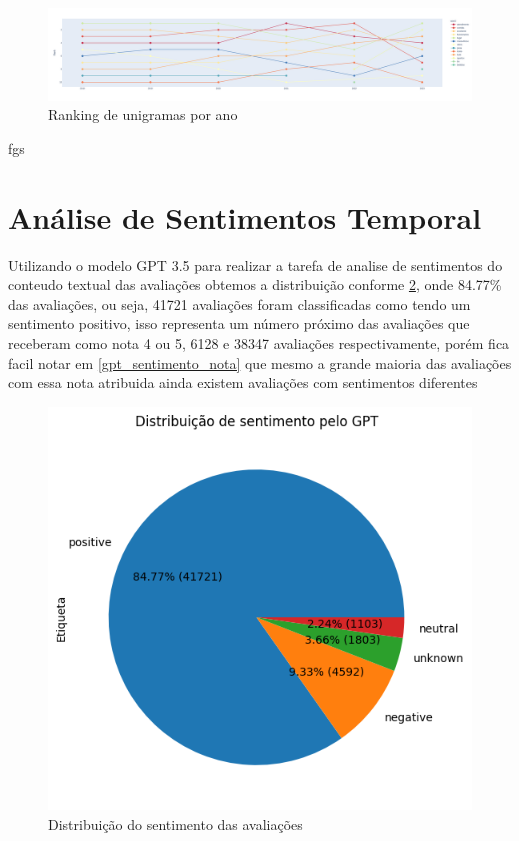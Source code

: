 \begin{figure}
	\centering
	\includegraphics[width=.7\textwidth]{figs/exploratoria/ranking_unigramas_por_ano.png}
	\caption{Ranking de unigramas por ano}
	\label{img:rank_unigramas}
\end{figure} fgs

\section{Análise de Sentimentos Temporal}
\label{cap:resultados:sec:analise_sentimento}

Utilizando o modelo GPT 3.5 para realizar a tarefa de analise de sentimentos do conteudo textual das avaliações obtemos a distribuição conforme \ref{img:gpt_pizza_distribuicao}, onde 84.77\% das avaliações, ou seja, 41721 avaliações foram classificadas como tendo um sentimento positivo, isso representa um número próximo das avaliações que receberam como nota 4 ou 5, 6128 e 38347 avaliações respectivamente, porém fica facil notar em \ref{gpt_sentimento_nota} que mesmo a grande maioria das avaliações com essa nota atribuida ainda existem avaliações com sentimentos diferentes

\begin{figure}
	\centering
	\includegraphics[width=1\textwidth]{figs/gpt/distribuicao_pizza.png}
	\caption{Distribuição do sentimento das avaliações}
	\label{img:gpt_pizza_distribuicao}
\end{figure}


